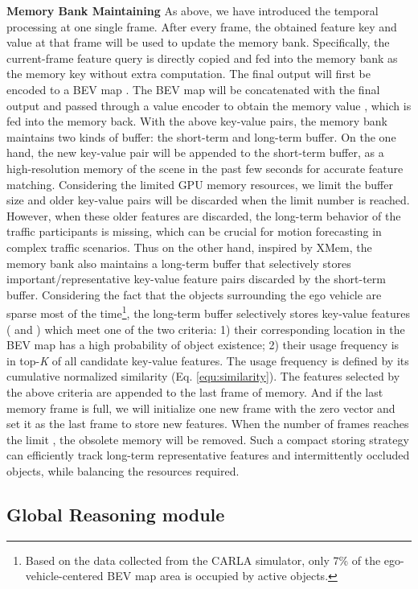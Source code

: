 \documentclass[10pt,twocolumn,letterpaper]{article}
\begin{document}
\noindent\textbf{Memory Bank Maintaining} As above, we have introduced the temporal processing at one single frame. After every  frame, the obtained feature key and value at that frame will be used to update the memory bank. Specifically, the current-frame feature query  is directly copied and fed into the memory bank as the memory key without extra computation. The final output  will first be encoded to a BEV map . The BEV map  will be concatenated with the final output  and passed through a value encoder to obtain the memory value , which is fed into the memory back. With the above key-value pairs, the memory bank maintains two kinds of buffer:  the short-term and long-term buffer. On the one hand, the new key-value pair will be appended to the short-term buffer, as a high-resolution memory of the scene in the past few seconds for accurate feature matching. Considering the limited GPU memory resources, we limit the buffer size and older key-value pairs will be discarded when the limit number  is reached. However, when these older features are discarded, the long-term behavior of the traffic participants is missing, which can be crucial for motion forecasting in complex traffic scenarios. Thus on the other hand, inspired by XMem\cite{cheng2022xmem}, the memory bank also maintains a long-term buffer that selectively stores important/representative key-value feature pairs discarded by the short-term buffer. Considering the fact that the objects surrounding the ego vehicle are sparse most of the time\footnote{Based on the data collected from the CARLA simulator, only 7\% of the ego-vehicle-centered BEV map area is occupied by active objects.}, the long-term buffer selectively stores key-value features ( and ) which meet one of the two criteria: 1) their corresponding location in the BEV map  has a high probability of object existence; 2) their usage frequency is in top-\textit{K} of all candidate key-value features. The usage frequency is defined by its cumulative normalized similarity (Eq. \ref{equ:similarity}).
The features selected by the above criteria are appended to the last frame of memory. And if the last memory frame is full, we will initialize one new frame with the zero vector and set it as the last frame to store new features. When the number of frames reaches the limit , the obsolete memory will be removed.
Such a compact storing strategy can efficiently track long-term representative features and intermittently occluded objects, while balancing the resources required. 

\subsection{Global Reasoning module}
\label{sec:global reasoning}
\end{document}
